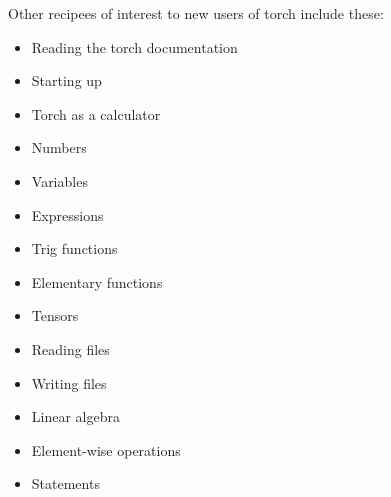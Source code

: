 \documentclass{article}
\begin{document}
Other recipees of interest to new users of torch include these:
\begin{itemize}
  \item Reading the torch documentation
  \item Starting up
  \item Torch as a calculator
  \item Numbers
  \item Variables
  \item Expressions
  \item Trig functions
  \item Elementary functions
  \item Tensors
  \item Reading files
  \item Writing files
  \item Linear algebra
  \item Element-wise operations
  \item Statements
\end{itemize}
\end{document}

